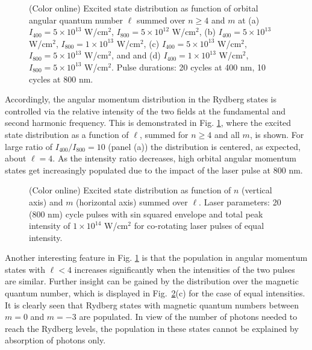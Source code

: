 \begin{figure}[h!]
\caption{\label{fig:l-distribution}
(Color online) 
Excited state distribution as function of orbital angular quantum number $\ell$ summed over $n \ge 4$ and $m$ at 
(a) $I_{400} = 5 \times 10^{13}$ W/cm$^2$, $I_{800} = 5 \times 10^{12}$ W/cm$^2$, 
(b) $I_{400} = 5 \times 10^{13}$ W/cm$^2$, $I_{800} = 1 \times 10^{13}$ W/cm$^2$, 
(c) $I_{400} = 5 \times 10^{13}$ W/cm$^2$, $I_{800} = 5 \times 10^{13}$ W/cm$^2$, and
and (d) $I_{400} = 1 \times 10^{13}$ W/cm$^2$, $I_{800} = 5 \times 10^{13}$ W/cm$^2$. Pulse durations: 20 cycles at 400 nm, 10 cycles at 800 nm.
}
\end{figure}

Accordingly, the angular momentum distribution in the Rydberg states is controlled via the relative intensity of the two fields at the fundamental and second harmonic frequency. This is demonstrated in Fig. \ref{fig:l-distribution}, where the excited state distribution as a function of $\ell$, summed for $n \ge 4$ and all $m$, is shown. For large ratio of $I_{400}/I_{800} = 10$ (panel (a)) the distribution is centered, as expected, about $\ell = 4$. As the intensity ratio decreases, high orbital angular momentum states get increasingly populated due to the impact of the laser pulse at 800 nm. 

\begin{figure}[h!]
\caption{\label{fig:nm-distribution}
(Color online) 
Excited state distribution as function of $n$ (vertical axis) and $m$ (horizontal axis) summed over $\ell$. Laser parameters: 20 (800 nm) cycle pulses with sin squared envelope and total peak intensity of $1\times10^{14}$ W/cm$^2$ for co-rotating laser pulses of equal intensity. 
}
\end{figure}

Another interesting feature in Fig. \ref{fig:l-distribution} is that the population in angular momentum states with $\ell < 4$ increases significantly when the intensities of the two pulses are similar. Further insight can be gained by the distribution over the magnetic quantum number, which is displayed in Fig.~\ref{fig:nm-distribution}(c) for the case of equal intensities. It is clearly seen that Rydberg states with magnetic quantum numbers between $m=0$ and $m=-3$ are populated. In view of the number of photons needed to reach the Rydberg levels, the population in these states cannot be explained by absorption of photons only. 

